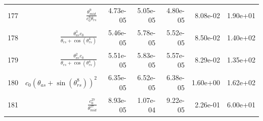 \begin{tabularx}{\textwidth}{lRRRRRl}
177  &  $ \displaystyle\frac{\theta_{mid}^{9}}{c_{0}^{9} \theta_{rs}} $  &  4.73e-05  &  5.05e-05  &  4.80e-05  &  8.08e-02  &  1.90e+01  \\ 
178  &  $ \displaystyle\frac{\theta_{as}^{3} c_{0}}{\theta_{rs} + \cos{\left(\theta_{rs}^{4} \right)}} $  &  5.46e-05  &  5.78e-05  &  5.52e-05  &  8.50e-02  &  1.40e+02  \\ 
179  &  $ \displaystyle\frac{\theta_{as}^{2} c_{0}}{\theta_{rs} + \cos{\left(\theta_{rs}^{4} \right)}} $  &  5.51e-05  &  5.83e-05  &  5.57e-05  &  8.29e-02  &  1.35e+02  \\ 
180  &  $ c_{0} \left(\theta_{as} + \sin{\left(\theta_{rs}^{8} \right)}\right)^{2} $  &  6.35e-05  &  6.52e-05  &  6.38e-05  &  1.60e+00  &  1.62e+02  \\ 
181  &  $ \displaystyle\frac{c_{0}^{27}}{\theta_{mid}^{27}} $  &  8.93e-05  &  1.07e-04  &  9.22e-05  &  2.26e-01  &  6.00e+01  \\ 
\bottomrule
\end{tabularx}
